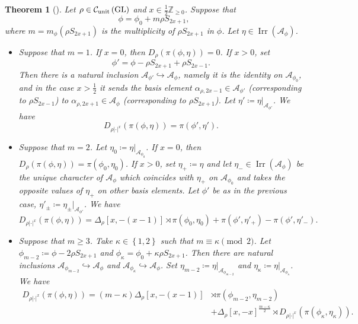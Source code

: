 \documentclass[11pt,letterpaper]{amsart}
\theoremstyle{plain}
\newcounter{theorem}[section]
\numberwithin{theorem}{section}
\numberwithin{equation}{subsection}
\newtheorem{Thm}[theorem]{Theorem}
\theoremstyle{remark}
\newcommand{\GL}{\operatorname{GL}}
\newcommand{\Irr}{\operatorname{Irr}}
\newcommand{\Z}{\mathbb{Z}}
\newcommand{\unit}{{\rm unit}}
\def\calA{\mathcal{A}}
\def\calC{\mathcal{C}}
\begin{document}
\begin{Thm}[{\cite[Thm. 4.2]{MR4055180}}]\label{T:AtobeJacLLCMainThm4.2}
Let $\rho\in\calC_{\unit}\left(\GL\right)$ and $x\in\frac{1}{2}\Z_{\geq 0}$. Suppose that 
\[
    \phi = \phi_0 + m \rho S_{2x+1},
\]
where $m = m_\phi\left(\rho S_{2x+1}\right)$ is the multiplicity of $\rho S_{2x+1}$ in $\phi$. Let $\eta\in\Irr\left(\calA_\phi\right)$. %
\begin{itemize}
        \item Suppose that $m=1$. If $x=0$, then $D_\rho\left(\pi\left(\phi,\eta\right)\right)=0$. If $x>0$, set
\[
    \phi' = \phi - \rho S_{2x+1} + \rho S_{2x-1}.
\]
Then there is a natural inclusion $\calA_{\phi'}\hookrightarrow \calA_{\phi}$, namely it is the identity on $\calA_{\phi_0}$, and in the case $x>\frac{1}{2}$ it sends the basis element $\alpha_{\rho,{2x-1}}\in\calA_{\phi'}$ (corresponding to $\rho S_{2x-1}$) to $\alpha_{\rho,2x+1}\in \calA_\phi$ (corresponding to $\rho S_{2x+1}$). Let $\eta'\coloneqq \eta\big|_{\calA_{\phi'}}$. We have
\[
    D_{\rho|\cdot|^x}\left(\pi\left(\phi,\eta\right)\right) = \pi\left(\phi',\eta'\right).
\]

        \vskip 5pt

        \item Suppose that $m=2$. Let $\eta_0\coloneqq \eta\big|_{\calA_{\phi_0}}$. If $x=0$, then $D_\rho\left(\pi\left(\phi,\eta\right)\right)=\pi\left(\phi_0,\eta_0\right)$. If $x>0$, set $\eta_+\coloneqq \eta$ and let $\eta_-\in\Irr\left(\calA_\phi\right)$ be the unique character of $\calA_\phi$ which coincides with $\eta_+$ on $\calA_{\phi_0}$ and takes the opposite values of $\eta_+$ on other basis elements. Let $\phi'$ be as in the previous case, $\eta'_\pm\coloneqq\eta_\pm\big|_{\calA_{\phi'}}$. We have
        \[
            D_{\rho|\cdot|^x}\left(\pi\left(\phi,\eta\right)\right) = \Delta_{\rho}\left[x,-(x-1)\right]\rtimes\pi\left(\phi_0,\eta_0\right) + \pi\left(\phi',\eta'_+\right) - \pi\left(\phi',\eta'_-\right).
        \]

        \vskip 5pt

        \item Suppose that $m\geq 3$. Take $\kappa\in\left\{1,2\right\}$ such that $m\equiv \kappa\pmod2$. Let $\phi_{m-2} \coloneqq \phi -2\rho S_{2x+1}$ and $\phi_\kappa = \phi_0 + \kappa \rho S_{2x+1}$. Then there are natural inclusions $\calA_{\phi_{m-2}} \hookrightarrow \calA_\phi$ and $\calA_{\phi_\kappa} \hookrightarrow \calA_\phi$. Set $\eta_{m-2} \coloneqq \eta\big|_{\calA_{\phi_{m-2}}}$ and $\eta_{\kappa} \coloneqq \eta\big|_{\calA_{\phi_{\kappa}}}$. We have
        \begin{align*}
            D_{\rho|\cdot|^x}\left(\pi\left(\phi,\eta\right)\right) = (m-\kappa)\Delta_{\rho}\left[x,-(x-1)\right]&\rtimes\pi\left(\phi_{m-2},\eta_{m-2}\right) \\
            &+ \Delta_\rho\left[x,-x\right]^{\frac{m-\kappa}{2}}\rtimes D_{\rho|\cdot|^x}\left(\pi\left(\phi_\kappa,\eta_\kappa\right)\right). 
        \end{align*}
    \end{itemize}    
\end{Thm}
\vskip 5pt
\end{document}
